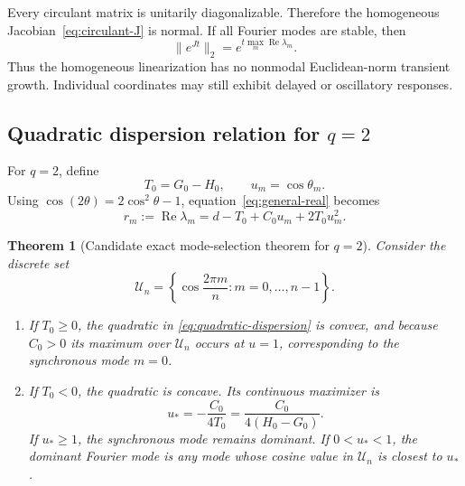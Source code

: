 \documentclass[11pt, reqno]{amsart}
\newtheorem{theorem}{Theorem}[section]
\theoremstyle{definition}
\theoremstyle{remark}
\newcommand{\Ree}{\operatorname{Re}}
\begin{document}
Every circulant matrix is unitarily diagonalizable.  Therefore the homogeneous
Jacobian~\eqref{eq:circulant-J} is normal.  If all Fourier modes are stable,
then
\begin{equation}
\label{eq:normal-decay}
    \|e^{Jt}\|_2
    =
    e^{t\max_m\Ree\lambda_m}.
\end{equation}
Thus the homogeneous linearization has no nonmodal Euclidean-norm transient
growth.  Individual coordinates may still exhibit delayed or oscillatory
responses.


\subsection{Quadratic dispersion relation for $q=2$}

For $q=2$, define
\begin{equation}
\label{eq:T-coefficient}
    T_0=G_0-H_0,
    \qquad
    u_m=\cos\theta_m.
\end{equation}
Using $\cos(2\theta)=2\cos^2\theta-1$, equation~\eqref{eq:general-real}
becomes
\begin{equation}
\label{eq:quadratic-dispersion}
    r_m:=\Ree\lambda_m
    =d-T_0+C_0u_m+2T_0u_m^2.
\end{equation}

\begin{theorem}[Candidate exact mode-selection theorem for $q=2$]
\label{thm:mode-selection}
Consider the discrete set
\[
    \mathcal U_n
    =
    \left\{\cos\frac{2\pi m}{n}:m=0,\ldots,n-1\right\}.
\]
\begin{enumerate}[label=(\roman*),leftmargin=2.5em]
    \item If $T_0\ge0$, the quadratic in
    \eqref{eq:quadratic-dispersion} is convex, and because $C_0>0$ its maximum
    over $\mathcal U_n$ occurs at $u=1$, corresponding to the synchronous mode
    $m=0$.

    \item If $T_0<0$, the quadratic is concave.  Its continuous maximizer is
    \begin{equation}
    \label{eq:u-star}
        u_*
        =-\frac{C_0}{4T_0}
        =\frac{C_0}{4(H_0-G_0)}.
    \end{equation}
    If $u_*\ge1$, the synchronous mode remains dominant.  If $0<u_*<1$, the
    dominant Fourier mode is any mode whose cosine value in $\mathcal U_n$ is
    closest to $u_*$.
\end{enumerate}
\end{theorem}
\end{document}
